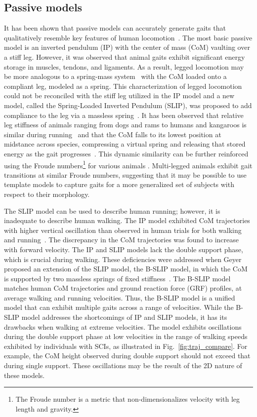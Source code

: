 \subsection{Passive models}

It has been shown that passive models can accurately generate gaits that qualitatively resemble key features of human locomotion~\cite{mochon1980ballistic}. The most basic passive model is an inverted pendulum (IP) with the center of mass (CoM) vaulting over a stiff leg. However, it was observed that animal gaits exhibit significant energy storage in muscles, tendons, and ligaments. As a result, legged locomotion may be more analogous to a spring-mass system~\cite{blickhan1989spring} with the CoM loaded onto a compliant leg, modeled as a spring. This characterization of legged locomotion could not be reconciled with the stiff leg utilized in the IP model and a new model, called the Spring-Loaded Inverted Pendulum (SLIP), was proposed to add compliance to the leg via a massless spring~\cite{blickhan1989spring}. It has been observed that relative leg stiffness of animals ranging from dogs and rams to humans and kangaroos is similar during running~\cite{blickhan1993similarity} and that the CoM falls to its lowest position at midstance across species, compressing a virtual spring and releasing that stored energy as the gait progresses~\cite{full1999templates}. This dynamic similarity can be further reinforced using the Froude numbers\footnote{The Froude number is a metric that non-dimensionalizes velocity with leg length and gravity.} for various animals \cite{alexander1984gaits}. Multi-legged animals exhibit gait transitions at similar Froude numbers, suggesting that it may be possible to use template models to capture gaits for a more generalized set of subjects with respect to their morphology.

The SLIP model can be used to describe human running; however, it is inadequate to describe human walking. The IP model exhibited CoM trajectories with higher vertical oscillation than observed in human trials for both walking and running~\cite{lee1998determinants}. The discrepancy in the CoM trajectories was found to increase with forward velocity. The IP and SLIP models lack the double support phase, which is crucial during walking. These deficiencies were addressed when Geyer proposed an extension of the SLIP model, the B-SLIP model, in which the CoM is supported by two massless springs of fixed stiffness~\cite{geyer2006compliant}. The  B-SLIP model matches human CoM trajectories and ground reaction force (GRF) profiles, at average walking and running velocities. Thus, the B-SLIP model is a unified model that can exhibit multiple gaits across a range of velocities. While the B-SLIP model addresses the shortcomings of IP and SLIP models, it has its drawbacks when walking at extreme velocities. The model exhibits oscillations during the double support phase at low velocities in the range of walking speeds exhibited by individuals with SCIs, as illustrated in Fig.~\ref{fig:traj_compare}. For example, the CoM height observed during double support should not exceed that during single support. These oscillations may be the result of the 2D nature of these models.

